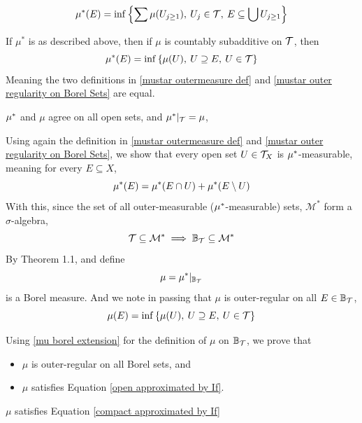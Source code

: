\documentclass[../../main.tex]{subfiles}
\begin{document}
\begin{enumalpha}
    \begin{equation}\label{mustar outermeasure def}
        \mu^*(E)= \inf\left\{\sum \mu(U_{j\geq 1}),\:U_j\in\mathcal{T},\:E\subseteq\bigcup U_{j\geq 1}\right\}
    \end{equation}
    \label{7.2.c}
%    
%    
    \item If $\mu^*$ is as described above, then if $\mu$ is countably subadditive on $\mathcal{T}$, then
    \begin{equation}\label{mustar outer regularity on Borel Sets}
        \mu^*(E) = \inf\left\{\mu(U),\:U\supseteq E,\: U\in\mathcal{T}\right\} 
    \end{equation}
    Meaning the two definitions in \eqref{mustar outermeasure def} and \eqref{mustar outer regularity on Borel Sets} are equal.
    \label{7.2.d}
%
%
    \item $\mu^*$ and $\mu$ agree on all open sets, and $\mu^*|_{\mathcal{T}} = \mu$, 
    \label{7.2.e}
%
%    
    \item Using again the definition in \eqref{mustar outermeasure def} and \eqref{mustar outer regularity on Borel Sets}, we show that every open set $U\in\mathcal{T}_X$ is $\mu^*$-measurable, meaning for every $E\subseteq X$,
    \[
    \mu^*(E) = \mu^*(E\cap U) + \mu^*(E\setminus U)
    \]
    With this, since the set of all outer-measurable ($\mu^*$-measurable) sets, $\mathcal{M}^*$ form a $\sigma$-algebra, 
    \[
    \mathcal{T}\subseteq \mathcal{M}^*\implies \mathbb{B}_{\mathcal{T}}\subseteq\mathcal{M}^*
    \]
    By Theorem 1.1, and define 
    \begin{equation}\label{mu borel extension}
        \mu = \mu^*|_{\mathbb{B}_{\mathcal{T}}}
    \end{equation} 
    is a Borel measure. And we note in passing that $\mu$ is outer-regular on all $E\in\mathbb{B}_{\mathcal{T}}$,
    \begin{equation}\label{mu outer-regular on all Borel}
         \mu(E) = \inf\left\{\mu(U),\:U\supseteq E,\: U\in\mathcal{T}\right\} 
    \end{equation}
    \label{7.2.f}
%
%
    \item Using \eqref{mu borel extension} for the definition of  $\mu$ on $\mathbb{B}_{\mathcal{T}}$, we prove that
    \begin{itemize}
        \item $\mu$ is outer-regular on all Borel sets, and
        \item $\mu$ satisfies Equation \eqref{open approximated by If}.
    \end{itemize}
    \label{7.2.g}
%
%
    \item $\mu$ satisfies Equation \eqref{compact approximated by If}

\end{enumalpha}
\end{document}
